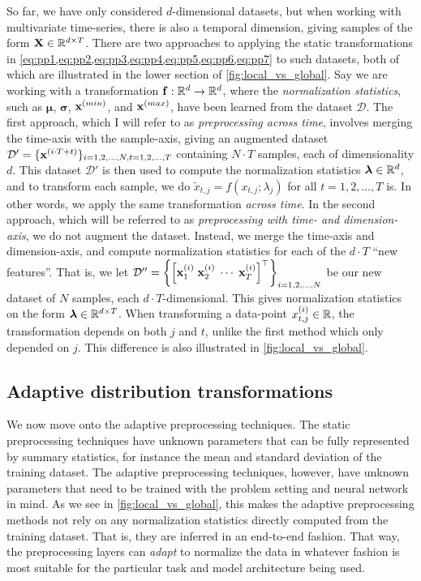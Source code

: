 \documentclass{statsmsc}
\begin{document}
{So far, we have only considered $d$-dimensional datasets, but when working with multivariate
time-series, there is also a temporal dimension, giving samples of the form
$\mathbf{X} \in \mathbb{R}^{d\times T}$. There are two approaches to applying the static
transformations in \cref{eq:pp1,eq:pp2,eq:pp3,eq:pp4,eq:pp5,eq:pp6,eq:pp7}
to such datasets, both of which are illustrated in the lower section of \cref{fig:local_vs_global}.
Say we are working with a transformation $\mathbf{f}: \mathbb{R}^d \rightarrow {\mathbb{R}^d}$, where the \textit{normalization statistics}, such as $\bm\mu$, $\bm\sigma$, $\mathbf{x}^{(min)}$, and $\mathbf{x}^{(max)}$, have been learned
from the dataset $\mathcal{D}$. The first approach, which I will refer to as
\textit{preprocessing across time}, involves merging the time-axis with the sample-axis, giving
an augmented dataset $\mathcal{D}'=\{\mathbf{x}^{(i\cdot T +t)}\}_{i=1,2,\dots,N,t=1,2,\dots,T}$
containing $N \cdot T$ samples, each of dimensionality $d$. This dataset $\mathcal{D}'$ is then
used to compute the normalization statistics $\bm\lambda \in \mathbb{R}^d$, and to transform each sample, we do
$\tilde{x}_{t,j}=f(x_{t,j};\lambda_j)$ for all $t=1,2,\dots,T$ is. In other words, we apply the same
transformation \textit{across time}.
%
In the second approach, which will be referred to as
\textit{preprocessing with time- and dimension-axis}, we do not augment the dataset. Instead,
we merge the time-axis and dimension-axis, and compute normalization statistics for
each of the $d \cdot T$ ``new features''. That is, we let
$\mathcal{D}''=\left\{\left[\mathbf{x}^{(i)}_{1} \; \mathbf{x}^{(i)}_{2} \; \cdots \; \mathbf{x}^{(i)}_{T} \right]^\top \right\}_{i=1,2,\dots,N}$ be our new dataset of $N$ samples, each $d\cdot T$-dimensional.
This gives normalization statistics on the form $\bm\lambda \in \mathbb{R}^{d\times T}$.
When transforming a data-point $x^{(i)}_{t,j}\in\mathbb{R}$, the transformation depends on both $j$ and $t$,
unlike the first method which only depended on $j$. This difference is also illustrated
in \cref{fig:local_vs_global}.



\subsection{Adaptive distribution transformations}%
\label{sub:Adaptive distribution transformations}

We now move onto the adaptive preprocessing techniques. The static
preprocessing techniques have unknown parameters that can be fully represented
by summary statistics, for instance the mean and standard deviation of the
training dataset. The adaptive preprocessing techniques, however, have unknown
parameters that need to be trained with the problem setting and neural network in
mind. As we see in \cref{fig:local_vs_global}, this makes the adaptive preprocessing methods
not rely on any normalization statistics directly computed from the training dataset.
That is, they are inferred in an end-to-end fashion. That way, the
preprocessing layers can \textit{adapt} to normalize the data in whatever
fashion is most suitable for the particular task and model architecture being used.


}
\end{document}
